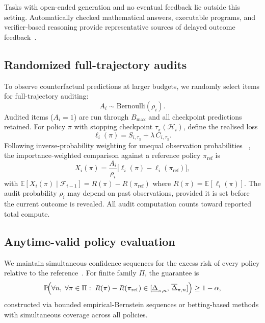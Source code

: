 \documentclass[a4paper,fleqn]{cas-sc}
\newcommand{\Hist}{\mathcal{H}}
\newcommand{\Bmax}{B_{\max}}
\newcommand{\Brier}{S}
\newcommand{\cost}{C}
\newcommand{\Exp}{\mathbb{E}}
\newcommand{\Prob}{\mathbb{P}}
\theoremstyle{plain}
\theoremstyle{definition}
\theoremstyle{remark}
\begin{document}
Tasks with open-ended generation and no eventual feedback lie outside this
setting. Automatically checked mathematical answers, executable programs, and
verifier-based reasoning provide representative sources of delayed outcome
feedback~\cite{cobbe2021verifiers,uesato2022process,brown2024monkeys}.

\subsection{Randomized full-trajectory audits}

To observe counterfactual predictions at larger budgets, we randomly select
items for full-trajectory auditing:
\begin{equation}
  A_i \sim \mathrm{Bernoulli}(\rho_i).
\end{equation}
Audited items ($A_i=1$) are run through $\Bmax$ and all checkpoint predictions
retained. For policy $\pi$ with stopping checkpoint $\tau_\pi(\Hist_i)$,
define the realised loss
\begin{equation}
  \ell_i(\pi) = \Brier_{i,\tau_\pi} + \lambda\,\cost_{i,\tau_\pi}.
\end{equation}
Following inverse-probability weighting for unequal observation probabilities
~\cite{horvitz1952sampling}, the importance-weighted comparison against a
reference policy $\pi_{\mathrm{ref}}$ is
\begin{equation}
  X_i(\pi)
  = \frac{A_i}{\rho_i}
    \bigl[\ell_i(\pi) - \ell_i(\pi_{\mathrm{ref}})\bigr],
  \label{eq:policy-ipw}
\end{equation}
with $\Exp[X_i(\pi)\mid\mathcal{F}_{i-1}] = R(\pi)-R(\pi_{\mathrm{ref}})$
where $R(\pi)=\Exp[\ell_i(\pi)]$. The audit probability $\rho_i$ may depend
on past observations, provided it is set before the current outcome is
revealed. All audit computation counts toward reported total compute.

\subsection{Anytime-valid policy evaluation}

We maintain simultaneous confidence sequences for the excess risk of every
policy relative to the reference~\cite{howard2021confidence,waudbysmith2024betting,ramdas2023safe}. For finite family $\Pi$, the guarantee is
\begin{equation}
  \Prob\!\Bigl(
    \forall n,\;\forall\pi\in\Pi:\;
    R(\pi)-R(\pi_{\mathrm{ref}})
    \in[\underline{\Delta}_{\pi,n},\,\overline{\Delta}_{\pi,n}]
  \Bigr) \geq 1-\alpha,
\end{equation}
constructed via bounded empirical-Bernstein sequences or betting-based methods
with simultaneous coverage across all policies.
\end{document}
